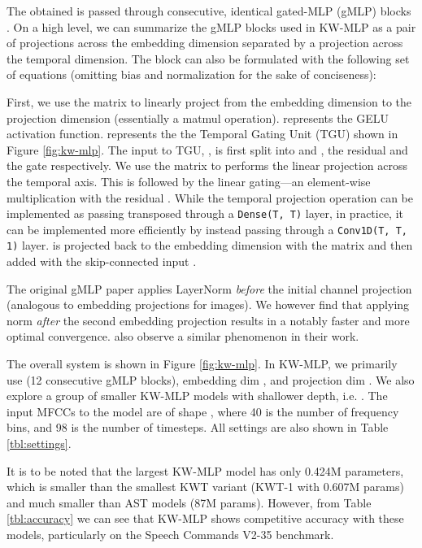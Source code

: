 \documentclass{article} \usepackage{iclr2022_conference,times}
\begin{document}
The obtained  is passed through  consecutive, identical gated-MLP (gMLP) blocks \citep{liu2021pay}. On a high level, we can summarize the gMLP blocks used in KW-MLP as a pair of projections across the embedding dimension separated by a projection across the temporal dimension. The block can also be formulated with the following set of equations (omitting bias and normalization for the sake of conciseness):




First, we use the matrix  to linearly project  from the embedding dimension  to the projection dimension  (essentially a matmul operation).  represents the GELU activation function.  represents the the Temporal Gating Unit (TGU) shown in Figure \ref{fig:kw-mlp}. The input to TGU, , is first split into  and , the residual and the gate respectively. We use the matrix  to performs the linear projection across the temporal axis. This is followed by the linear gating---an element-wise multiplication with the residual . While the temporal projection operation can be implemented as passing  transposed through a \texttt{Dense(T, T)} layer, in practice, it can be implemented more efficiently by instead passing  through a \texttt{Conv1D(T, T, 1)} layer.  is projected back to the embedding dimension  with the matrix  and then added with the skip-connected input .

The original gMLP paper \citep{liu2021pay} applies LayerNorm \textit{before} the initial channel projection (analogous to embedding projections for images). We however find that applying norm \textit{after} the second embedding projection results in a notably faster and more optimal convergence. \citet{berg21_interspeech} also observe a similar phenomenon in their work.

The overall system is shown in Figure \ref{fig:kw-mlp}. In KW-MLP, we primarily use  (12 consecutive gMLP blocks), embedding dim , and projection dim . We also explore a group of smaller KW-MLP models with shallower depth, i.e. . The input MFCCs to the model are of shape , where 40 is the number of frequency bins, and 98 is the number of timesteps. All settings are also shown in Table \ref{tbl:settings}.

It is to be noted that the largest KW-MLP model has only 0.424M parameters, which is smaller than the smallest KWT variant (KWT-1 with 0.607M params) and much smaller than AST models (87M params). However, from Table \ref{tbl:accuracy} we can see that KW-MLP shows competitive accuracy with these models, particularly on the Speech Commands V2-35 benchmark.
\end{document}

